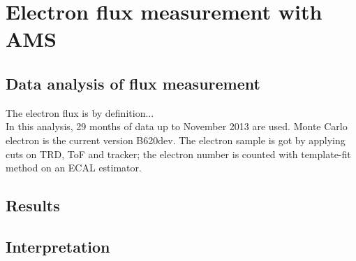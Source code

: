 \part{Electron flux measurement with AMS}


\chapter{Data analysis of flux measurement}
The electron flux is by definition...\\
In this analysis, 29 months of data up to November 2013 are used. Monte Carlo electron is the current version B620dev. The electron sample is got by applying cuts on TRD, ToF and tracker; the electron number is counted with template-fit method on an ECAL estimator.








\chapter{Results}



\chapter{Interpretation}